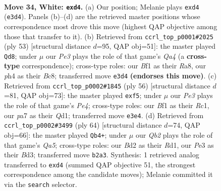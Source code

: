 \documentclass[11pt]{article}
\begin{document}
\clearpage

\begin{figure}[p]\centering
\begin{subfigure}{0.46\textwidth}\centering
\resizebox{\linewidth}{!}{%
\newchessgame
\chessboard[
  setfen={1r1rnk2/p1p5/5p2/2P2q2/3p1P1p/1P2P3/1Q1BK1RP/5BR1 w - - 0 34},
  showmover=false,
  pgfstyle=straightmove, color=movearrow, markmove={e3-d4}
]}
\caption{}
\end{subfigure}\hfill
\begin{subfigure}{0.46\textwidth}\centering
\resizebox{\linewidth}{!}{%
\newchessgame
\chessboard[
  setfen={r1b2rk1/5p2/2p1p2P/q5pP/1pP5/2bNQ1R1/P4PB1/3R1K2 b - - 3 27},
  showmover=false,
  pgfstyle=straightmove, color=movearrow, markmove={a5-d8}
]}
\caption{}
\end{subfigure}
\\[4pt]
\begin{subfigure}{0.46\textwidth}\centering
\resizebox{\linewidth}{!}{%
\newchessgame
\chessboard[
  setfen={1rrn4/4q1kp/pp2P1p1/4pp2/1PP1P3/5BP1/7P/1RRQ2K1 w - - 1 29},
  showmover=false,
  pgfstyle=straightmove, color=movearrow, markmove={e4-f5}
]}
\caption{}
\end{subfigure}\hfill
\begin{subfigure}{0.46\textwidth}\centering
\resizebox{\linewidth}{!}{%
\newchessgame
\chessboard[
  setfen={1kr5/p2r3q/3p4/Q1nP1Pp1/3p3p/2PB1P1P/2K3P1/3R3R w - - 0 33},
  showmover=false,
  pgfstyle=straightmove, color=movearrow, markmove={a5-b4}
]}
\caption{}
\end{subfigure}
\caption{\textbf{Move 34, White: \texttt{exd4}.} (a) Our position; Melanie plays \texttt{exd4} (\texttt{e3d4}). Panels (b)--(d) are the retrieved master positions whose correspondence most drove this move (highest QAP objective among those that transfer to it). (b) Retrieved from \texttt{ccrl\_top\_p0001\#2025} (ply 53) [structural distance $d$=95, QAP obj=51]: the master played \texttt{Qd8}; under $\mu$ our \emph{Pe3} plays the role of that game's \emph{Qa4} (a \textbf{cross-type} correspondence); cross-type roles: our \emph{B}f1 as their \emph{R}a8, our \emph{p}h4 as their \emph{B}c8; transferred move \texttt{e3d4} \textbf{(endorses this move)}. (c) Retrieved from \texttt{ccrl\_top\_p0002\#1845} (ply 56) [structural distance $d$=81, QAP obj=73]: the master played \texttt{exf5}; under $\mu$ our \emph{Pe3} plays the role of that game's \emph{Pe4}; cross-type roles: our \emph{B}f1 as their \emph{R}c1, our \emph{p}a7 as their \emph{Q}d1; transferred move \texttt{e3e4}. (d) Retrieved from \texttt{ccrl\_top\_p0002\#3499} (ply 64) [structural distance $d$=74, QAP obj=66]: the master played \texttt{Qb4+}; under $\mu$ our \emph{Qb2} plays the role of that game's \emph{Qa5}; cross-type roles: our \emph{B}d2 as their \emph{R}d1, our \emph{P}e3 as their \emph{B}d3; transferred move \texttt{b2a3}. Synthesis: 1 retrieved analog transferred to \texttt{exd4} (summed QAP objective 51, the strongest correspondence among the candidate moves); Melanie committed it via the \texttt{search} selector.}
\label{fig:thought-m66}
\end{figure}
\end{document}
